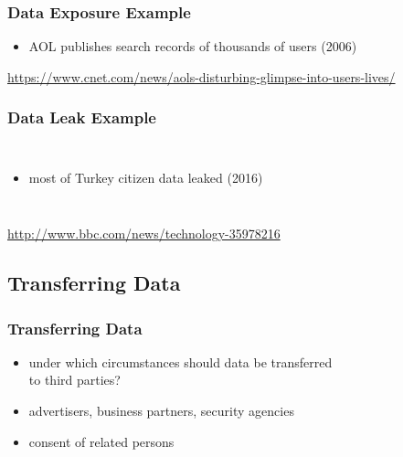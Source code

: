 \documentclass[dvipsnames]{beamer}
\theoremstyle{plain}
\begin{document}
\begin{frame}
  \frametitle{Data Exposure Example}

  \begin{center}
  \end{center}

  \begin{itemize}
    \item AOL publishes search records of thousands of users (2006)
  \end{itemize}

  \medskip
  \tiny{\url{https://www.cnet.com/news/aols-disturbing-glimpse-into-users-lives/}}\\
\end{frame}

\begin{frame}
  \frametitle{Data Leak Example}

  \begin{columns}

    \begin{itemize}
      \item most of Turkey citizen data leaked (2016)
    \end{itemize}
  \end{columns}

  \medskip
  \tiny{\url{http://www.bbc.com/news/technology-35978216}}\\
\end{frame}

\subsection{Transferring Data}

\begin{frame}
  \frametitle{Transferring Data}

  \begin{itemize}
    \item under which circumstances should data be transferred\\
      to third parties?
    \item advertisers, business partners, security agencies
    \item consent of related persons
  \end{itemize}
\end{frame}
\end{document}

